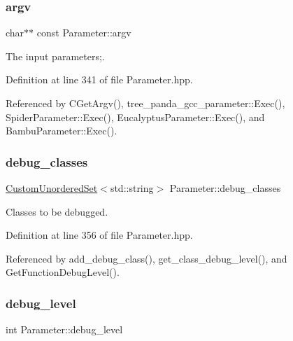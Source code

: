 \mbox{\label{classParameter_a538da2e132ca91996baa116097d6238f}} 
\subsubsection{\texorpdfstring{argv}{argv}}
{\footnotesize\ttfamily char$\ast$$\ast$ const Parameter\+::argv\hspace{0.3cm}{\ttfamily [protected]}}



The input parameters;. 



Definition at line 341 of file Parameter.\+hpp.



Referenced by C\+Get\+Argv(), tree\+\_\+panda\+\_\+gcc\+\_\+parameter\+::\+Exec(), Spider\+Parameter\+::\+Exec(), Eucalyptus\+Parameter\+::\+Exec(), and Bambu\+Parameter\+::\+Exec().

\mbox{\label{classParameter_aea8911a644a863588dfeb64f74619937}} 
\subsubsection{\texorpdfstring{debug\+\_\+classes}{debug\_classes}}
{\footnotesize\ttfamily \hyperlink{classCustomUnorderedSet}{Custom\+Unordered\+Set}$<$std\+::string$>$ Parameter\+::debug\+\_\+classes\hspace{0.3cm}{\ttfamily [protected]}}



Classes to be debugged. 



Definition at line 356 of file Parameter.\+hpp.



Referenced by add\+\_\+debug\+\_\+class(), get\+\_\+class\+\_\+debug\+\_\+level(), and Get\+Function\+Debug\+Level().

\mbox{\label{classParameter_a03af0919e121aef0fa02cd11de566a80}} 
\subsubsection{\texorpdfstring{debug\+\_\+level}{debug\_level}}
{\footnotesize\ttfamily int Parameter\+::debug\+\_\+level\hspace{0.3cm}{\ttfamily [protected]}}



